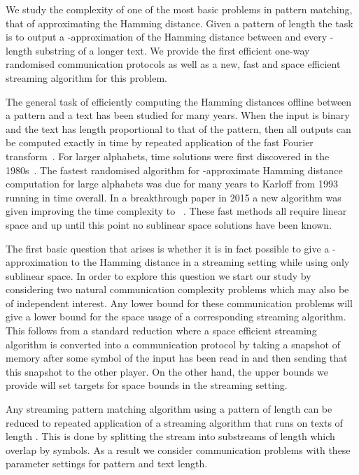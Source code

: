 We study the complexity of one of the most basic problems in pattern matching, that of approximating the Hamming distance.  Given a pattern  of length   the task is to output a -approximation of the Hamming distance between  and every -length substring of a longer text. We provide the first efficient one-way randomised communication protocols as well as a new, fast and space efficient streaming algorithm for this problem.  

The general task of efficiently computing the Hamming distances offline between a pattern and a text has been studied for many years.  When the input is binary and the text has length proportional to that of the pattern, then all outputs can be computed exactly in  time by repeated application of the fast Fourier transform~\cite{FP:1974}. For larger alphabets,  time solutions were first discovered in the 1980s~\cite{Abrahamson:1987,Kosaraju:1987}. The fastest randomised algorithm for -approximate Hamming distance computation for large alphabets was due for many years to Karloff from 1993~\cite{Karloff:1993} running in  time overall.  In a breakthrough paper in 2015 a new algorithm was given improving the time complexity to ~\cite{KP:2015}.  These fast methods all require linear space and up until this point no sublinear space solutions have been known.

The first basic question that arises is whether it is in fact possible to give a -approximation to the Hamming distance in a streaming setting while using only sublinear space. In order to explore this question we start our study by considering two natural communication complexity problems which may also be of independent interest. Any lower bound for these communication problems will give a lower bound for the space usage of a corresponding streaming algorithm. This follows from a standard reduction where a space efficient streaming algorithm is converted into a communication protocol by taking a snapshot of memory after some symbol of the input has been read in and then sending that this snapshot to the other player. On the other hand, the upper bounds we provide will set targets for space bounds in the streaming setting.

Any streaming pattern matching algorithm using a pattern of length  can be reduced to repeated application of a streaming algorithm that runs on texts of length . This is done by splitting the stream into substreams of length  which overlap by  symbols.  As a result we consider communication problems with these parameter settings for pattern and text length.

